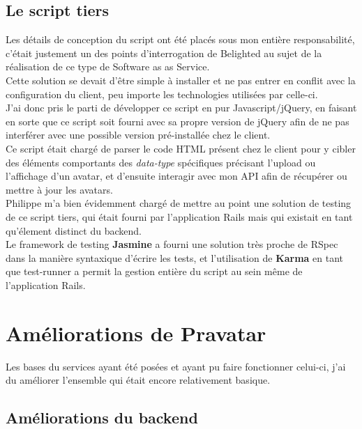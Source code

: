 \documentclass{report}
\begin{document}
    \subsection{Le script tiers}
    \label{subs:Le script tiers}

      Les détails de conception du script ont été placés sous mon entière responsabilité, c'était justement un des points d'interrogation de Belighted au sujet de la réalisation de ce type de Software as
      as Service.\\
      Cette solution se devait d'être simple à installer et ne pas entrer en conflit avec la configuration du client, peu importe les technologies utilisées par celle-ci.\\

      J'ai donc pris le parti de développer ce script en pur Javascript/jQuery, en faisant en sorte que ce script soit fourni avec sa propre version de jQuery afin de ne pas interférer avec une
      possible version pré-installée chez le client.\\
      Ce script était chargé de parser le code HTML présent chez le client pour y cibler des éléments comportants des \textit{data-type} spécifiques précisant l'upload ou l'affichage d'un avatar, et d'ensuite
      interagir avec mon API afin de récupérer ou mettre à jour les avatars.\\

      Philippe m'a bien évidemment chargé de mettre au point une solution de testing de ce script tiers, qui était fourni par l'application Rails mais qui existait en tant qu'élement distinct du backend.\\
      Le framework de testing \textbf{Jasmine} a fourni une solution très proche de RSpec dans la manière syntaxique d'écrire les tests, et l'utilisation de \textbf{Karma} en tant que test-runner a
      permit la gestion entière du script au sein même de l'application Rails.\\

  \section{Améliorations de Pravatar}
  \label{sec:Améliorations de Pravatar}

    Les bases du services ayant été posées et ayant pu faire fonctionner celui-ci, j'ai du améliorer l'ensemble qui était encore relativement basique.\\

    \subsection{Améliorations du backend}
    \label{subs:Améliorations du backend}
\end{document}
